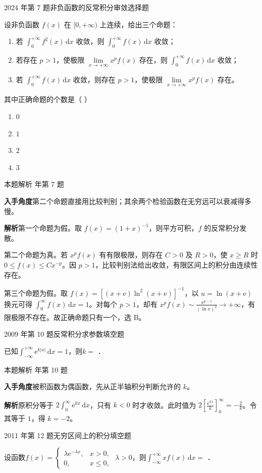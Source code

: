\documentclass[UTF8,zihao=-4,fontset=fandol]{ctexart}
\renewcommand{\lim}{\operatorname*{lim}\limits}
\newcommand{\blank}{\underline{\hspace{5em}}}
\newenvironment{abcd}{\begin{enumerate}[label=\textup{(\Alph*)},leftmargin=2.3em,itemsep=1pt,topsep=4pt,parsep=1pt]}{\end{enumerate}}
\newcommand{\choices}[4]{%
  \begin{abcd}
    \item #1
    \item #2
    \item #3
    \item #4
  \end{abcd}}
\newcommand{\QuestionPage}[6]{%
  \par\noindent\begin{minipage}{\linewidth}
  \raggedright
  {\small\textcolor{black!60}{#3\quad #5}\hfill\textcolor{accent}{#2}}\par\smallskip}
\newcommand{\QuestionEnd}{\end{minipage}\par\medskip}
\newcommand{\QuestionPage}[6]{%
  \clearpage
  {\small\textcolor{accent}{#1\hfill #2}}\par\medskip
  {\small\textcolor{black!60}{#3\quad #5\hfill #6}}\par\vspace{9bp}}
\newcommand{\QuestionEnd}{}
\newenvironment{QuestionSolution}[1]{%
  \clearpage
  {\small\textcolor{black!60}{本题解析\quad #1}}\par\medskip
}{\par\clearpage}
\begin{document}
\QuestionPage{3.5 反常积分}{选择题}{2024 年第 7 题}{1}{非负函数的反常积分审敛}{195 / 234}
设非负函数 \(f(x)\) 在 \([0,+\infty)\) 上连续，给出三个命题：
\begin{enumerate}
\item 若 \(\int_0^{+\infty}f^2(x)\,\mathrm{d}x\) 收敛，则 \(\int_0^{+\infty}f(x)\,\mathrm{d}x\) 收敛；
\item 若存在 \(p>1\)，使极限 \(\lim_{x\to+\infty}x^p f(x)\) 存在，则 \(\int_0^{+\infty}f(x)\,\mathrm{d}x\) 收敛；
\item 若 \(\int_0^{+\infty}f(x)\,\mathrm{d}x\) 收敛，则存在 \(p>1\)，使极限 \(\lim_{x\to+\infty}x^p f(x)\) 存在。
\end{enumerate}
其中正确命题的个数是（ ）
\choices{\(0\)}{\(1\)}{\(2\)}{\(3\)}
\QuestionEnd

\begin{QuestionSolution}{2024 年第 7 题}
\textbf{入手角度}\quad 第二个命题直接用比较判别；其余两个检验函数在无穷远可以衰减得多慢。

\textbf{解析}\quad 第一个命题为假。取 \(f(x)=(1+x)^{-1}\)，则平方可积，\(f\) 的反常积分发散。

第二个命题为真。若 \(x^pf(x)\) 有有限极限，则存在 \(C>0\) 及 \(R>0\)，使 \(x\ge R\) 时 \(0\le f(x)\le Cx^{-p}\)。因 \(p>1\)，比较判别法给出收敛，有限区间上的积分由连续性存在。

第三个命题为假。取 \(f(x)=[(x+\mathrm{e})\ln^2(x+\mathrm{e})]^{-1}\)，以 \(u=\ln(x+\mathrm{e})\) 换元可得 \(\int_0^\infty f(x)\,\mathrm{d}x=1\)。对每个 \(p>1\)，却有 \(x^pf(x)\sim \frac{x^{p-1}}{(\ln x)^2}\to+\infty\)，有限极限不存在。故正确命题只有一个，选 B。
\end{QuestionSolution}

\QuestionPage{3.5 反常积分}{填空题}{2009 年第 10 题}{2}{反常积分求参数}{196 / 234}
已知$\int_{-\infty}^{+\infty}\mathrm{e}^{k|x|}\,\mathrm{d} x = 1$，则$k=$ \blank{}．
\QuestionEnd

\begin{QuestionSolution}{2009 年第 10 题}
\textbf{入手角度}\quad 被积函数为偶函数，先从正半轴积分判断允许的 \(k\)。

\textbf{解析}\quad 原积分等于 \(2\int_0^\infty \mathrm{e}^{kx}\,\mathrm{d}x\)，只有 \(k<0\) 时才收敛。此时值为 \(2[\frac{\mathrm{e}^{kx}}{k}]_0^\infty=-\frac{2}{k}\)。令其等于 \(1\)，得 \(k=\boxed{-2}\)。
\end{QuestionSolution}

\QuestionPage{3.5 反常积分}{填空题}{2011 年第 12 题}{2}{无穷区间上的积分}{197 / 234}
设函数$f(x) = \begin{cases}
  \lambda \mathrm{e}^{- \lambda x}, & x > 0, \\
                         0, & x \le 0,
\end{cases}$ $\lambda > 0$，则$\int_{-\infty}^{+\infty} xf(x)\,\mathrm{d} x =$ \blank{}．
\QuestionEnd
\end{document}
